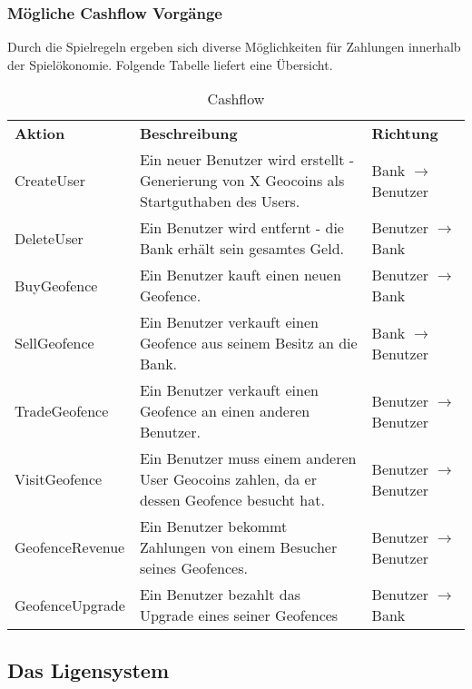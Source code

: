 \documentclass{scrreprt}
\begin{document}
\subsubsection{Mögliche Cashflow Vorgänge}
Durch die Spielregeln ergeben sich diverse Möglichkeiten für Zahlungen innerhalb der Spielökonomie. Folgende Tabelle liefert eine Übersicht.
\begin{table}[h]
     \centering
     \begin{tabular}{l|p{8cm}|l}
		\textbf{Aktion}	&	\textbf{Beschreibung}	&	\textbf{Richtung} \\
       CreateUser          & Ein neuer Benutzer wird erstellt - Generierung von X Geocoins als Startguthaben des Users.  &   Bank $\rightarrow$ Benutzer       \\
       \hline
           DeleteUser        & Ein Benutzer wird entfernt - die Bank erhält sein gesamtes Geld.   &  Benutzer $\rightarrow$ Bank       \\
       \hline
       BuyGeofence       & Ein Benutzer kauft einen neuen Geofence.   &  Benutzer $\rightarrow$ Bank        \\
       \hline
       SellGeofence        & Ein Benutzer verkauft einen Geofence aus seinem Besitz an die Bank.   & Bank $\rightarrow$ Benutzer        \\
       \hline
       TradeGeofence        & Ein Benutzer verkauft einen Geofence an einen anderen Benutzer.   &     Benutzer $\rightarrow$ Benutzer    \\
       \hline
        VisitGeofence        & Ein Benutzer muss einem anderen User Geocoins zahlen, da er dessen Geofence besucht hat.   &   Benutzer $\rightarrow$ Benutzer      \\
       \hline
         GeofenceRevenue        & Ein Benutzer bekommt Zahlungen von einem Besucher seines Geofences.   &    Benutzer $\rightarrow$ Benutzer     \\
       \hline
         GeofenceUpgrade        & Ein Benutzer bezahlt das Upgrade eines seiner Geofences   &  Benutzer $\rightarrow$ Bank       \\

     \end{tabular}

     \caption{Cashflow}
     \label{tbl:beispieltabelle}

   \end{table}
\subsection{Das Ligensystem}
\end{document}
